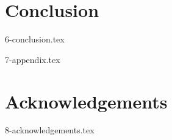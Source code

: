\documentclass[a4paper,11pt]{report}
\begin{document}
\chapter{Conclusion}
{6-conclusion.tex}

\begin{appendices}
{7-appendix.tex}
\end{appendices}

\chapter*{Acknowledgements}
{8-acknowledgements.tex}

\newpage

\renewcommand{\bibname}{References}



\end{document}
